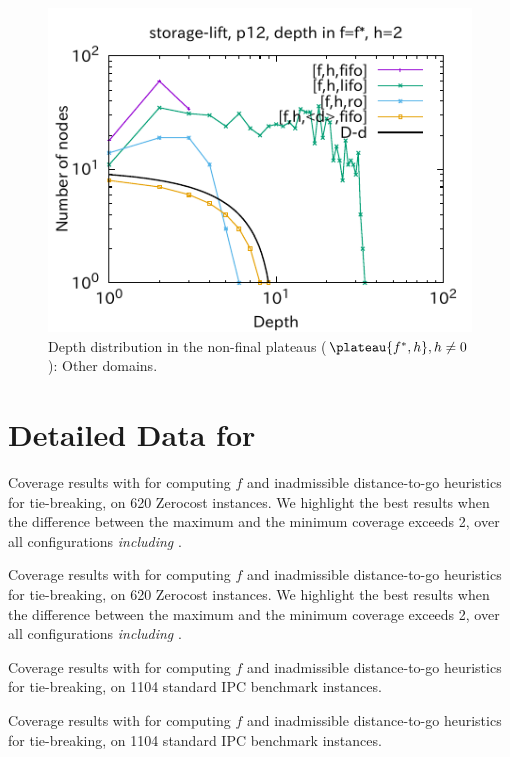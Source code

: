 \begin{figure}[htbp]
\includegraphics[width=0.49\linewidth]{img/output-lmcut/storage-lift/p12-2.pdf}
 \caption{Depth distribution in the non-final plateaus ($\plateau{f^*,h}, h\not=0$): Other domains.}
 \label{fig:depth-histogram5}
\end{figure}

\clearpage
\section{Detailed Data for }

\setlength{\tabcolsep}{0.1em}

\begin{table}[htbp]
 {
 \centering
 
 \caption{
 Coverage results with { \lmcut for computing $f$ and inadmissible distance-to-go heuristics for tie-breaking, on 620 Zerocost instances}. We highlight the best results when the difference between the maximum and the minimum coverage exceeds 2, over all configurations \emph{including }.
 }
 \label{tbl:dtg-lmcut-zero}
 }
\end{table}

\begin{table}[htbp]
 {
 \centering
 
 \caption{
 Coverage results with \mands for computing $f$ and inadmissible distance-to-go heuristics for tie-breaking, on 620 Zerocost instances. We highlight the best results when the difference between the maximum and the minimum coverage exceeds 2, over all configurations \emph{including }.
 }
 \label{tbl:dtg-mands-zero}
 }
\end{table}

\begin{table}[htbp]
 {
 \centering
 
 \caption{
 Coverage results with \lmcut for computing $f$ and inadmissible distance-to-go heuristics for tie-breaking, on 1104 standard IPC benchmark instances.
 }
 \label{tbl:dtg-lmcut-ipc}
 }
\end{table}

\begin{table}[htbp]
 {
 \centering
 
 \caption{
 Coverage results with \mands for computing $f$ and inadmissible distance-to-go heuristics for tie-breaking, on 1104 standard IPC benchmark instances.
 }
 \label{tbl:dtg-mands-ipc} }
\end{table}
